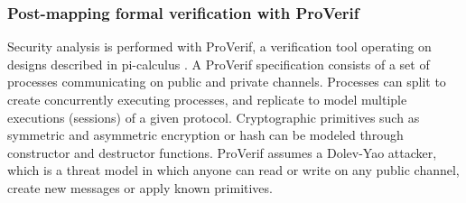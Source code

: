 \documentclass{llncs}
\begin{document}
\noindent
%
%
%

\subsubsection{Post-mapping formal verification with ProVerif}

Security analysis is performed with ProVerif, a verification tool operating on designs described in pi-calculus
\cite{BlanchetJCS08}. A ProVerif specification consists of a set of processes communicating on public and private
channels. Processes can split to create concurrently executing processes, and replicate to model multiple executions
(sessions) of a given protocol. Cryptographic primitives such as symmetric and asymmetric encryption or hash can be
modeled through constructor and destructor functions. ProVerif assumes a Dolev-Yao attacker, which is a threat model in
which anyone can read or write on any public channel, create new messages or apply known primitives.
\end{document}
